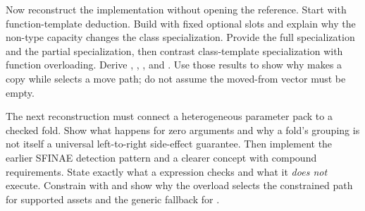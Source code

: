 Now reconstruct the implementation without opening the reference. Start with  function-template deduction. Build  with fixed optional slots and explain why the non-type capacity changes the class specialization. Provide the full  specialization and the partial  specialization, then contrast class-template specialization with function overloading. Derive , , , and . Use those results to show why  makes a copy while  selects a move path; do not assume the moved-from vector must be empty.

The next reconstruction must connect a heterogeneous parameter pack to a checked fold. Show what happens for zero arguments and why a fold's grouping is not itself a universal left-to-right side-effect guarantee. Then implement the earlier  SFINAE detection pattern and a clearer  concept with compound requirements. State exactly what a  expression checks and what it \emph{does not} execute. Constrain  with  and show why the overload  selects the constrained path for supported assets and the generic fallback for .

